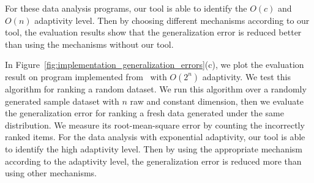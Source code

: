For these data analysis programs,
our tool is able to identify the $O(c)$ and $O(n)$ adaptivity level.
Then by choosing different mechanisms according to our tool,
the evaluation results show that the generalization error is reduced better than 
using the mechanisms without our tool.

In Figure~\ref{fig:implementation_generalization_errors}(c), we plot the 
evaluation result on
program implemented from~\cite{Jamieson2015TheAO} with $O(2^n)$ adaptivity.
We test this algorithm for ranking a random dataset. 
We run this algorithm over a randomly generated sample dataset with $n$ raw and constant dimension,
then we evaluate the generalization error for ranking
a fresh data generated under the same distribution.
We measure its root-mean-square error by counting the incorrectly ranked items.
For the data analysis with exponential adaptivity, our tool is able to identify the high adaptivity level.
Then by using the appropriate mechanism according to the adaptivity level,
the generalization error is reduced more than using other mechanisms.


